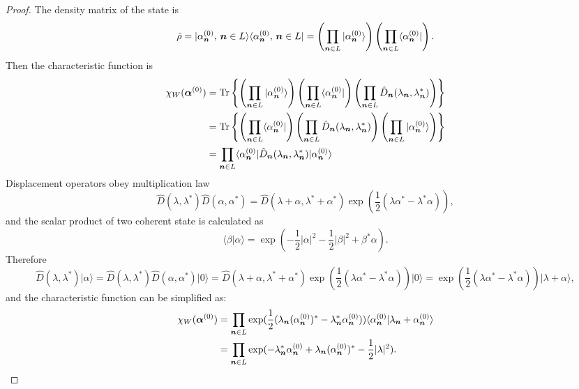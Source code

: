 \begin{proof}
The density matrix of the state is
\[
	\hat{\rho}
	= \vert \alpha_{\boldsymbol{n}}^{(0)},\, \boldsymbol{n} \in L \rangle
		\langle \alpha_{\boldsymbol{n}}^{(0)},\, \boldsymbol{n} \in L \vert
	= \left( \prod_{\boldsymbol{n} \in L} \vert \alpha_{\boldsymbol{n}}^{(0)} \rangle \right)
		\left( \prod_{\boldsymbol{n} \in L} \langle \alpha_{\boldsymbol{n}}^{(0)} \vert \right).
\]
Then the characteristic function is
\begin{equation*}
\begin{split}
	\chi_W (\bm{\alpha}^{(0)})
	& = \mathrm{Tr} \left\{ 
		\left( \prod_{\boldsymbol{n} \in L} \vert \alpha_{\boldsymbol{n}}^{(0)} \rangle \right)
		\left( \prod_{\boldsymbol{n} \in L} \langle \alpha_{\boldsymbol{n}}^{(0)} \vert \right)
		\left( \prod_{\boldsymbol{n} \in L} \hat{D}_{\boldsymbol{n}} (\lambda_{\boldsymbol{n}}, \lambda_{\boldsymbol{n}}^*) \right)
	 \right\} \\
	& = \mathrm{Tr} \left\{ 
		\left( \prod_{\boldsymbol{n} \in L} \langle \alpha_{\boldsymbol{n}}^{(0)} \vert \right)
		\left( \prod_{\boldsymbol{n} \in L} \hat{D}_{\boldsymbol{n}} (\lambda_{\boldsymbol{n}}, \lambda_{\boldsymbol{n}}^*) \right)
		\left( \prod_{\boldsymbol{n} \in L} \vert \alpha_{\boldsymbol{n}}^{(0)} \rangle \right)
	 \right\} \\
	& = \prod_{\boldsymbol{n} \in L}
		\langle \alpha_{\boldsymbol{n}}^{(0)} \vert
		\hat{D}_{\boldsymbol{n}} (\lambda_{\boldsymbol{n}}, \lambda_{\boldsymbol{n}}^*)
		\vert \alpha_{\boldsymbol{n}}^{(0)} \rangle
\end{split}
\end{equation*}
Displacement operators obey multiplication law 
\[
	\hat{D}(\lambda, \lambda^*) \hat{D}(\alpha, \alpha^*)
	= \hat{D}(\lambda + \alpha, \lambda^* + \alpha^*)
		\exp(\frac{1}{2} (\lambda \alpha^* - \lambda^* \alpha)),
\]
and the scalar product of two coherent state is calculated as 
\[
	\langle \beta \vert \alpha \rangle
	= \exp(-\frac{1}{2} |\alpha|^2 - \frac{1}{2} |\beta|^2 + \beta^* \alpha).
\]
Therefore
\[
	\hat{D}(\lambda, \lambda^*) \vert \alpha \rangle
	= \hat{D}(\lambda, \lambda^*) \hat{D}(\alpha, \alpha^*) \vert 0 \rangle
	= \hat{D}(\lambda + \alpha, \lambda^* + \alpha^*)
		\exp(\frac{1}{2} (\lambda \alpha^* - \lambda^* \alpha))
		\vert 0 \rangle
	= \exp(\frac{1}{2} (\lambda \alpha^* - \lambda^* \alpha))
		\vert \lambda + \alpha \rangle,
\]
and the characteristic function can be simplified as:
\begin{equation*}
\begin{split}
	\chi_W (\bm{\alpha}^{(0)})
	& = \prod_{\boldsymbol{n} \in L}
		\exp(\frac{1}{2} (\lambda_{\boldsymbol{n}} (\alpha_{\boldsymbol{n}}^{(0)})^*
			- \lambda_{\boldsymbol{n}}^* \alpha_{\boldsymbol{n}}^{(0)}))
		\langle \alpha_{\boldsymbol{n}}^{(0)} \vert \lambda_{\boldsymbol{n}} + \alpha_{\boldsymbol{n}}^{(0)} \rangle \\
	& = \prod_{\boldsymbol{n} \in L}
		\exp(
			- \lambda_{\boldsymbol{n}}^* \alpha_{\boldsymbol{n}}^{(0)}
			+ \lambda_{\boldsymbol{n}} (\alpha_{\boldsymbol{n}}^{(0)})^*
			- \frac{1}{2} |\lambda|^2
		).
\end{split}
\end{equation*}


\end{proof}
